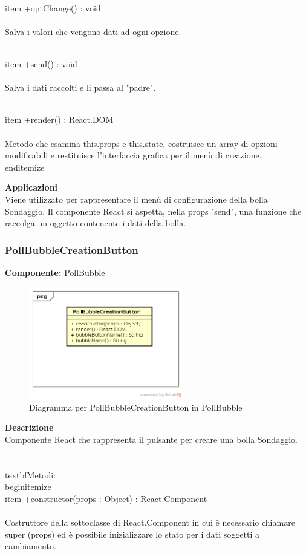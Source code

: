 \\item +optChange() : void 
\\\\
Salva i valori che vengono dati ad ogni opzione.

\\item +send() : void 
\\\\
Salva i dati raccolti e li passa al "padre".

\\item +render() : React.DOM \\\\
Metodo che esamina this.props e this.state, costruisce un array di opzioni modificabili e restituisce l'interfaccia grafica per il menù di creazione.
\\end{itemize} 


\textbf{Applicazioni}\\
Viene utilizzato per rappresentare il menù di configurazione della bolla Sondaggio. Il componente React si aspetta, nella props "send", una funzione che raccolga un oggetto contenente i dati della bolla. 


\clearpage

\subsubsection{PollBubbleCreationButton}
\textbf{Componente:}  PollBubble\\
   \FloatBarrier
   \begin{figure}[ht]
   \centering
   \includegraphics[width=0.6\textwidth]{img/single-PollBubbleCreationButton}
   \caption{{Diagramma per PollBubbleCreationButton in PollBubble}}
\end{figure}
\FloatBarrier
\textbf{Descrizione}\\
Componente React che rappresenta il pulsante per creare una bolla Sondaggio.
\\\\
\\textbf{Metodi:} 
\\begin{itemize}
\\item +constructor(props : Object) : React.Component 
\\\\
Costruttore della sottoclasse di React.Component in cui è necessario chiamare super (props) ed è possibile inizializzare lo stato per i dati soggetti a cambiamento.

